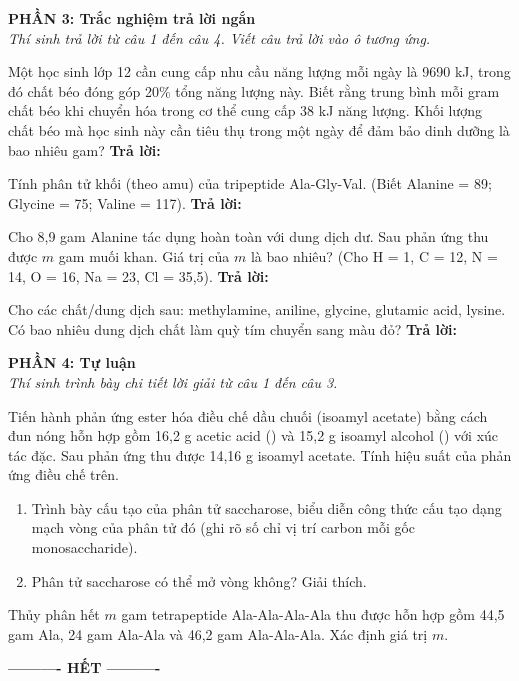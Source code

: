 \documentclass[11pt,a4paper]{article}
\begin{document}
\vspace{5pt}
\noindent
\textbf{\color{mainGreen}PHẦN 3: Trắc nghiệm trả lời ngắn}\\
\textit{Thí sinh trả lời từ câu 1 đến câu 4. Viết câu trả lời vào ô tương ứng.}

\begin{ex}
Một học sinh lớp 12 cần cung cấp nhu cầu năng lượng mỗi ngày là 9690 kJ, trong đó chất béo đóng góp 20\% tổng năng lượng này. Biết rằng trung bình mỗi gram chất béo khi chuyển hóa trong cơ thể cung cấp 38 kJ năng lượng. Khối lượng chất béo mà học sinh này cần tiêu thụ trong một ngày để đảm bảo dinh dưỡng là bao nhiêu gam?
\vskip 2pt
\textbf{Trả lời:} \dotfill
\end{ex}

\begin{ex}
Tính phân tử khối (theo amu) của tripeptide Ala-Gly-Val. (Biết Alanine = 89; Glycine = 75; Valine = 117).
\vskip 2pt
\textbf{Trả lời:} \dotfill
\end{ex}

\begin{ex}
Cho 8,9 gam Alanine tác dụng hoàn toàn với dung dịch  dư. Sau phản ứng thu được $m$ gam muối khan. Giá trị của $m$ là bao nhiêu? (Cho H = 1, C = 12, N = 14, O = 16, Na = 23, Cl = 35,5).
\vskip 2pt
\textbf{Trả lời:} \dotfill
\end{ex}

\begin{ex}
Cho các chất/dung dịch sau: methylamine, aniline, glycine, glutamic acid, lysine. Có bao nhiêu dung dịch chất làm quỳ tím chuyển sang màu đỏ?
\vskip 2pt
\textbf{Trả lời:} \dotfill
\end{ex}

\vspace{5pt}
\noindent
\textbf{\color{mainGreen}PHẦN 4: Tự luận}\\
\textit{Thí sinh trình bày chi tiết lời giải từ câu 1 đến câu 3.}

\begin{ex}
Tiến hành phản ứng ester hóa điều chế dầu chuối (isoamyl acetate) bằng cách đun nóng hỗn hợp gồm 16,2 g acetic acid () và 15,2 g isoamyl alcohol () với xúc tác  đặc. Sau phản ứng thu được 14,16 g isoamyl acetate. Tính hiệu suất của phản ứng điều chế trên.
\vskip 50pt
\end{ex}

\begin{ex}
\phantom{a}
\begin{enumerate}[label=\alph*)]
\item Trình bày cấu tạo của phân tử saccharose, biểu diễn công thức cấu tạo dạng mạch vòng của phân tử đó (ghi rõ số chỉ vị trí carbon mỗi gốc monosaccharide).
\item Phân tử saccharose có thể mở vòng không? Giải thích.
\end{enumerate}
\vskip 60pt
\end{ex}

\begin{ex}
Thủy phân hết $m$ gam tetrapeptide Ala-Ala-Ala-Ala thu được hỗn hợp gồm 44,5 gam Ala, 24 gam Ala-Ala và 46,2 gam Ala-Ala-Ala. Xác định giá trị $m$.
\vskip 50pt
\end{ex}

\begin{center}
\textbf{---------- HẾT ----------}
\end{center}
\end{document}

